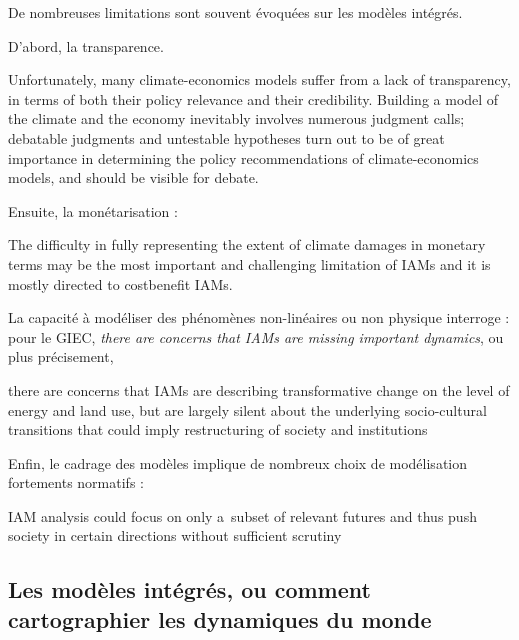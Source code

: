De nombreuses limitations sont souvent évoquées sur les modèles intégrés. 

D'abord, la transparence.

\begin{displayquote}
    Unfortunately, many climate-economics models suffer from a lack of transparency, in terms of both their policy relevance and their credibility. Building a model of the climate and the economy inevitably involves numerous judgment calls; debatable judgments and untestable hypotheses turn out to be of great importance in determining the policy recommendations of climate-economics models, and should be visible for debate. \cite{stanton_inside_2009}
\end{displayquote}

Ensuite, la monétarisation : 

\begin{displayquote}
    The difficulty in fully representing the extent of climate damages in monetary terms may be the most important and challenging limitation of IAMs and it is mostly directed to costbenefit IAMs. \cite{intergovernmental_panel_on_climate_change_ipcc_annex_2023}
\end{displayquote}

La capacité à modéliser des phénomènes non-linéaires ou non physique interroge : pour le GIEC, \emph{there are concerns that IAMs are missing important dynamics}, ou plus précisement, 

\begin{displayquote}
    there are concerns that IAMs are describing transformative change on the level of energy and land use, but are largely silent about the underlying socio-cultural transitions that could imply restructuring of society and institutions
\end{displayquote}

Enfin, le cadrage des modèles implique de nombreux choix de modélisation fortements normatifs : 

\begin{displayquote}
    IAM analysis could focus on only a subset of relevant futures and thus push society in certain directions without sufficient scrutiny
\end{displayquote}

\subsection{Les modèles intégrés, ou comment cartographier les dynamiques du monde}
\label{sect:1.3.1}

